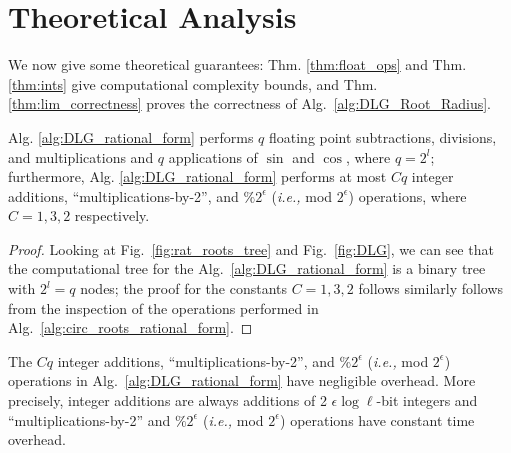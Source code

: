\documentclass[runningheads]{llncs}
\begin{document}
\section{Theoretical Analysis}\label{sec:the_ana}
We now give some theoretical guarantees: Thm. \ref{thm:float_ops} and Thm. \ref{thm:ints} give computational complexity bounds, and Thm. \ref{thm:lim_correctness} proves the correctness of Alg.~\ref{alg:DLG_Root_Radius}.
\begin{theorem}\label{thm:float_ops}
Alg. \ref{alg:DLG_rational_form} performs $q $ floating point subtractions, divisions, and multiplications and $q $ applications of $\sin$ and $\cos$, where $q = 2^l$; furthermore, Alg. \ref{alg:DLG_rational_form} performs at most $Cq $  integer additions, ``multiplications-by-2'', and $ \%2^\epsilon $ (\emph{i.e.,} mod $ 2^\epsilon $) operations, where $C=1,3,2$ respectively.
\end{theorem}
\begin{proof}
Looking at Fig.~\ref{fig:rat_roots_tree} and Fig.~\ref{fig:DLG}, we can see that the computational tree for the Alg.~\ref{alg:DLG_rational_form} is a binary tree with $2^l = q$ nodes; the proof for the constants $C=1,3,2$ follows similarly follows from the inspection of the operations performed in Alg.~\ref{alg:circ_roots_rational_form}.
\end{proof}

\begin{theorem}\label{thm:ints}
The $Cq $  integer additions, ``multiplications-by-2'', and $ \%2^\epsilon $ (\emph{i.e.,} mod $ 2^\epsilon $) operations in Alg.~\ref{alg:DLG_rational_form} have negligible overhead. More precisely, integer additions are always additions of 2 $\epsilon \log \ell $-bit integers and ``multiplications-by-2'' and $ \%2^\epsilon $ (\emph{i.e.,} mod $ 2^\epsilon $) operations have constant time overhead.
\end{theorem}
\end{document}

